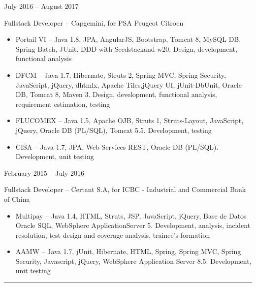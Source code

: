 \documentclass[a4paper,10pt]{article}
\newlength{\cvcolumngapwidth}
\newlength{\cvleftcolumnwidth}
\newlength{\cvrightcolumnwidth}
\newcommand{\cvsectionstyle}[1]{{\normalsize\cvsectionfont\textcolor{cvsectioncolor}{#1}}}
\newcommand{\cvtitlestyle}[1]{{\large\cvtitlefont\textcolor{cvtitlecolor}{#1}}}
\newcommand{\cvdurationstyle}[1]{{\small\cvdurationfont\textcolor{cvdurationcolor}{#1}}}
\newlength{\cvafteritemskipamount}
\newlength{\cvaftersectionskipamount}
\newlength{\cvaftertitleskipamount}
\newlength{\cvparskip}
\newcommand{\cvsection}[1]{
    \begin{minipage}[t]{\cvleftcolumnwidth}
        \raggedleft\cvsectionstyle{#1}
    \end{minipage}%
    \hspace{\cvcolumngapwidth}%
    \begin{minipage}[t]{\cvrightcolumnwidth}
        \textcolor{cvrulecolor}{\rule{\cvrightcolumnwidth}{0.6mm}}
    \end{minipage}

    \vspace{\cvaftersectionskipamount}
}
\newcommand{\cvitem}[2]{
    \begin{minipage}[t]{\cvleftcolumnwidth}
        \raggedleft #1
    \end{minipage}%
    \hspace{\cvcolumngapwidth}%
    \begin{minipage}[t]{\cvrightcolumnwidth}
        \setlength{\parskip}{\cvparskip} #2
    \end{minipage}

    \vspace{\cvafteritemskipamount}
}
\newcommand{\cvtitle}[1]{
    \cvtitlestyle{#1}

    \vspace{\cvaftertitleskipamount}
    \vspace{-\cvparskip}
}
\newcommand{\emptyline}{\vspace{1mm}}
\begin{document}
\cvitem{
    \cvdurationstyle{July 2016 -- August 2017}
}{
    \cvtitle{Fullstack Developer -- \normalsize Capgemini, for PSA Peugeot Citroen \emptyline}

    \begin{itemize}[leftmargin=*]
    
        \item Portail VI -- Java 1.8, JPA, AngularJS, Bootstrap, Tomcat 8, MySQL DB, Spring Batch, JUnit. DDD with Seedstackand w20. Design, development, functional analysis \emptyline
        
        \item DFCM -- Java 1.7, Hibernate, Struts 2, Spring MVC, Spring Security, JavaScript, jQuery, dhtmlx, Apache Tiles,jQuery UI, jUnit-DbUnit, Oracle DB, Tomcat 8, Maven 3. Design, development, functional analysis, requirement estimation, testing \emptyline
        
        \item FLUCOMEX -- Java 1.5, Apache OJB, Struts 1, Struts-Layout, JavaScript, jQuery, Oracle DB (PL/SQL), Tomcat 5.5. Development, testing \emptyline
        
        \item CISA -- Java 1.7, JPA, Web Services REST, Oracle DB (PL/SQL). Development, unit testing
        
    \end{itemize}
}

\cvitem{
    \cvdurationstyle{February 2015 -- July 2016}
}{
    \cvtitle{Fullstack Developer -- \normalsize Certant S.A, for ICBC - Industrial and Commercial Bank of China \emptyline}
    
    \begin{itemize}[leftmargin=*]
        \item Multipay -- Java 1.4, HTML, Struts, JSP, JavaScript, jQuery, Base de Datos Oracle SQL, WebSphere ApplicationServer 5. Development, analysis, incident resolution, test design and coverage analysis, trainee’s formation \emptyline
        
        \item AAMW -- Java 1.7, jUnit, Hibernate, HTML, Spring, Spring MVC, Spring Security, Javascript, jQuery, WebSphere Application Server 8.5. Development, unit testing
        
    \end{itemize}
}


\cvsection{EDUCATION}
\end{document}
